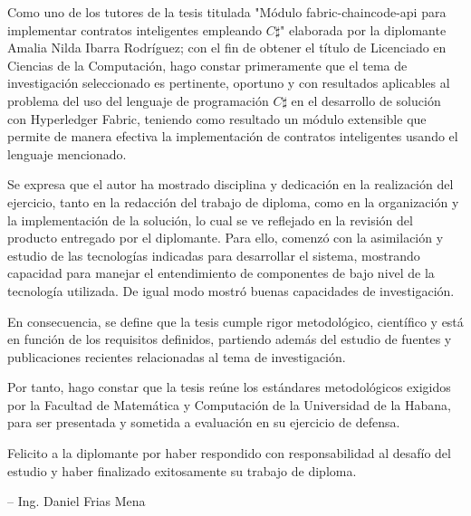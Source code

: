 \begin{opinion}
Como uno de los tutores de la tesis titulada "Módulo fabric-chaincode-api para implementar contratos inteligentes empleando $C\sharp$" elaborada por la diplomante Amalia Nilda Ibarra Rodríguez; con el fin de obtener el título de Licenciado en Ciencias de la Computación, hago constar primeramente que el tema de investigación seleccionado es pertinente, oportuno y con resultados aplicables al problema del uso del lenguaje de programación $C\sharp$ en el desarrollo de solución con Hyperledger Fabric, teniendo como resultado un módulo extensible que permite de manera efectiva la implementación de contratos inteligentes usando el lenguaje mencionado. 

Se expresa que el autor ha mostrado disciplina y dedicación en la realización del ejercicio, tanto en la redacción del trabajo de diploma, como en la organización y la implementación de la solución, lo cual se ve reflejado en la revisión del producto entregado por el diplomante. Para ello, comenzó con la asimilación y estudio de las tecnologías indicadas para desarrollar el sistema, mostrando capacidad para manejar el entendimiento de componentes de bajo nivel de la tecnología utilizada. De igual modo mostró buenas capacidades de investigación.

En consecuencia, se define que la tesis cumple rigor metodológico, científico y está en función de los requisitos definidos, partiendo además del estudio de fuentes y publicaciones recientes relacionadas al tema de investigación.

Por tanto, hago constar que la tesis reúne los estándares metodológicos exigidos por la Facultad de Matemática y Computación de la Universidad de la Habana, para ser presentada y sometida a evaluación en su ejercicio de defensa.

Felicito a la diplomante por haber respondido con responsabilidad al desafío del estudio y haber finalizado exitosamente su trabajo de diploma.

--
Ing. Daniel Frias Mena

\end{opinion}